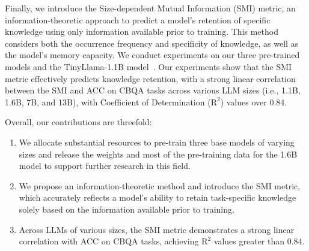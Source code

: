 Finally, we introduce the Size-dependent Mutual Information (SMI) metric, an information-theoretic approach to predict a model’s retention of specific knowledge using only information available prior to training. This method considers both the occurrence frequency and specificity of knowledge, as well as the model’s memory capacity. We conduct experiments on our three pre-trained models and the TinyLlama-1.1B model~\cite{DBLP:journals/corr/abs-2401-02385}. Our experiments show that the SMI metric effectively predicts knowledge retention, with a strong linear correlation between the SMI and ACC on CBQA tasks across various LLM sizes (i.e., 1.1B, 1.6B, 7B, and 13B), with Coefficient of Determination ($\text{R}^2$) values over 0.84.


Overall, our contributions are threefold:
\begin{enumerate}
    \item We allocate substantial resources to pre-train three base models of varying sizes and release the weights and most of the pre-training data for the 1.6B model to support further research in this field.
    \item We propose an information-theoretic method and introduce the SMI metric, which accurately reflects a model's ability to retain task-specific knowledge solely based on the information available prior to training.
    \item Across LLMs of various sizes, the SMI metric demonstrates a strong linear correlation with ACC on CBQA tasks, achieving $\text{R}^2$ values greater than 0.84.
\end{enumerate}